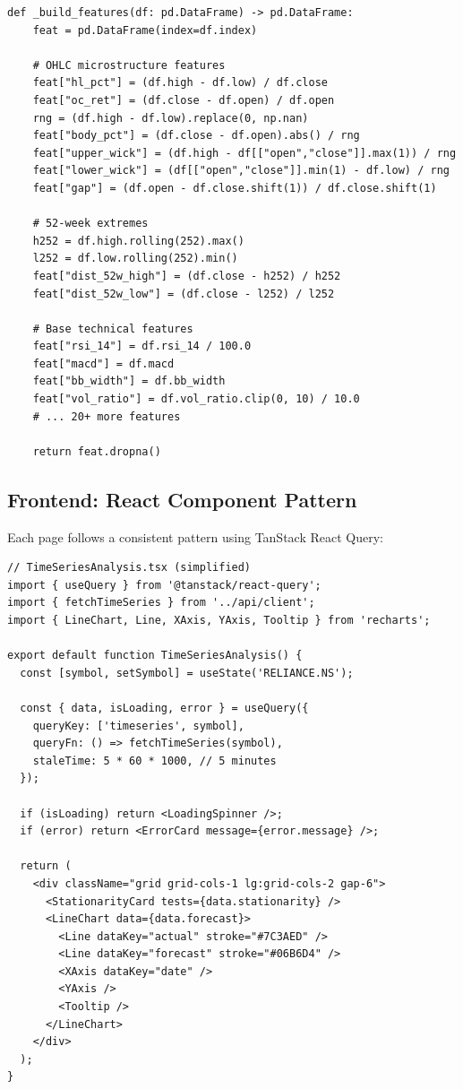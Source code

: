 \documentclass[12pt, a4paper, oneside]{report}
\begin{document}
\begin{lstlisting}[style=pythonstyle, caption={OHLC microstructure feature engineering (simplified)}, label={lst:ohlc_features}]
def _build_features(df: pd.DataFrame) -> pd.DataFrame:
    feat = pd.DataFrame(index=df.index)

    # OHLC microstructure features
    feat["hl_pct"] = (df.high - df.low) / df.close
    feat["oc_ret"] = (df.close - df.open) / df.open
    rng = (df.high - df.low).replace(0, np.nan)
    feat["body_pct"] = (df.close - df.open).abs() / rng
    feat["upper_wick"] = (df.high - df[["open","close"]].max(1)) / rng
    feat["lower_wick"] = (df[["open","close"]].min(1) - df.low) / rng
    feat["gap"] = (df.open - df.close.shift(1)) / df.close.shift(1)

    # 52-week extremes
    h252 = df.high.rolling(252).max()
    l252 = df.low.rolling(252).min()
    feat["dist_52w_high"] = (df.close - h252) / h252
    feat["dist_52w_low"] = (df.close - l252) / l252

    # Base technical features
    feat["rsi_14"] = df.rsi_14 / 100.0
    feat["macd"] = df.macd
    feat["bb_width"] = df.bb_width
    feat["vol_ratio"] = df.vol_ratio.clip(0, 10) / 10.0
    # ... 20+ more features

    return feat.dropna()
\end{lstlisting}

\subsection{Frontend: React Component Pattern}

Each page follows a consistent pattern using TanStack React Query:

\begin{lstlisting}[style=jsstyle, caption={Typical React page component pattern (TypeScript)}, label={lst:react_pattern}]
// TimeSeriesAnalysis.tsx (simplified)
import { useQuery } from '@tanstack/react-query';
import { fetchTimeSeries } from '../api/client';
import { LineChart, Line, XAxis, YAxis, Tooltip } from 'recharts';

export default function TimeSeriesAnalysis() {
  const [symbol, setSymbol] = useState('RELIANCE.NS');

  const { data, isLoading, error } = useQuery({
    queryKey: ['timeseries', symbol],
    queryFn: () => fetchTimeSeries(symbol),
    staleTime: 5 * 60 * 1000, // 5 minutes
  });

  if (isLoading) return <LoadingSpinner />;
  if (error) return <ErrorCard message={error.message} />;

  return (
    <div className="grid grid-cols-1 lg:grid-cols-2 gap-6">
      <StationarityCard tests={data.stationarity} />
      <LineChart data={data.forecast}>
        <Line dataKey="actual" stroke="#7C3AED" />
        <Line dataKey="forecast" stroke="#06B6D4" />
        <XAxis dataKey="date" />
        <YAxis />
        <Tooltip />
      </LineChart>
    </div>
  );
}
\end{lstlisting}
\end{document}
